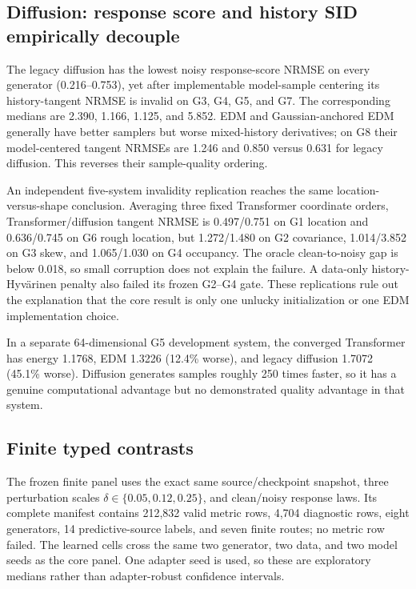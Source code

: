\subsection{Diffusion: response score and history SID empirically decouple}

The legacy diffusion has the lowest noisy response-score NRMSE on every generator
(0.216--0.753), yet after implementable model-sample centering its history-tangent
NRMSE is invalid on G3, G4, G5, and G7.  The corresponding medians are 2.390,
1.166, 1.125, and 5.852.  EDM and Gaussian-anchored EDM generally have better
samplers but worse mixed-history derivatives; on G8 their model-centered tangent
NRMSEs are 1.246 and 0.850 versus 0.631 for legacy diffusion.  This reverses their
sample-quality ordering.

An independent five-system invalidity replication reaches the same
location-versus-shape conclusion.  Averaging three fixed Transformer coordinate
orders, Transformer/diffusion tangent NRMSE is 0.497/0.751 on G1 location and
0.636/0.745 on G6 rough location, but 1.272/1.480 on G2 covariance,
1.014/3.852 on G3 skew, and 1.065/1.030 on G4 occupancy.  The oracle clean-to-noisy
gap is below 0.018, so small corruption does not explain the failure.  A
data-only history-Hyv\"arinen penalty also failed its frozen G2--G4 gate.  These
replications rule out the explanation that the core result is only one unlucky
initialization or one EDM implementation choice.

In a separate 64-dimensional G5 development system, the converged Transformer
has energy 1.1768, EDM 1.3226 (12.4\% worse), and legacy diffusion 1.7072
(45.1\% worse).  Diffusion generates samples roughly 250 times faster, so it has
a genuine computational advantage but no demonstrated quality advantage in that
system.

\subsection{Finite typed contrasts}

The frozen finite panel uses the exact same source/checkpoint snapshot, three
perturbation scales $\delta\in\{0.05,0.12,0.25\}$, and clean/noisy response laws.
Its complete manifest contains 212,832 valid metric rows, 4,704 diagnostic rows,
eight generators, 14 predictive-source labels, and seven finite routes; no metric
row failed.  The learned cells cross the same two generator, two data, and two
model seeds as the core panel.  One adapter seed is used, so these are exploratory
medians rather than adapter-robust confidence intervals.

